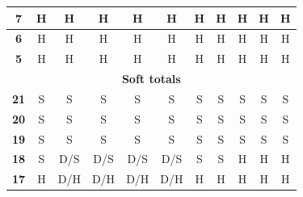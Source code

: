 \documentclass[conference]{IEEEtran}
\begin{document}
\begin{table}[htbp]
\begin{tabular}{|c|c|c|c|c|c|c|c|c|c|c|}
\textbf{7} & \cellcolor[HTML]{FE0000}H & \cellcolor[HTML]{FE0000}H & \cellcolor[HTML]{FE0000}H & \cellcolor[HTML]{FE0000}H & \cellcolor[HTML]{FE0000}H & \cellcolor[HTML]{FE0000}H & \cellcolor[HTML]{FE0000}H & \cellcolor[HTML]{FE0000}H & \cellcolor[HTML]{FE0000}H & \cellcolor[HTML]{FE0000}H \\ \hline
\textbf{6} & \cellcolor[HTML]{FE0000}H & \cellcolor[HTML]{FE0000}H & \cellcolor[HTML]{FE0000}H & \cellcolor[HTML]{FE0000}H & \cellcolor[HTML]{FE0000}H & \cellcolor[HTML]{FE0000}H & \cellcolor[HTML]{FE0000}H & \cellcolor[HTML]{FE0000}H & \cellcolor[HTML]{FE0000}H & \cellcolor[HTML]{FE0000}H \\ \hline
\textbf{5} & \cellcolor[HTML]{FE0000}H & \cellcolor[HTML]{FE0000}H & \cellcolor[HTML]{FE0000}H & \cellcolor[HTML]{FE0000}H & \cellcolor[HTML]{FE0000}H & \cellcolor[HTML]{FE0000}H & \cellcolor[HTML]{FE0000}H & \cellcolor[HTML]{FE0000}H & \cellcolor[HTML]{FE0000}H & \cellcolor[HTML]{FE0000}H \\ \hline
\multicolumn{11}{|c|}{\textbf{Soft totals}} \\ \hline
\textbf{21} & \cellcolor[HTML]{32CB00}S & \cellcolor[HTML]{32CB00}S & \cellcolor[HTML]{32CB00}S & \cellcolor[HTML]{32CB00}S & \cellcolor[HTML]{32CB00}S & \cellcolor[HTML]{32CB00}S & \cellcolor[HTML]{32CB00}S & \cellcolor[HTML]{32CB00}S & \cellcolor[HTML]{32CB00}S & \cellcolor[HTML]{32CB00}S \\ \hline
\textbf{20} & \cellcolor[HTML]{32CB00}S & \cellcolor[HTML]{32CB00}S & \cellcolor[HTML]{32CB00}S & \cellcolor[HTML]{32CB00}S & \cellcolor[HTML]{32CB00}S & \cellcolor[HTML]{32CB00}S & \cellcolor[HTML]{32CB00}S & \cellcolor[HTML]{32CB00}S & \cellcolor[HTML]{32CB00}S & \cellcolor[HTML]{32CB00}S \\ \hline
\textbf{19} & \cellcolor[HTML]{32CB00}S & \cellcolor[HTML]{32CB00}S & \cellcolor[HTML]{32CB00}S & \cellcolor[HTML]{32CB00}S & \cellcolor[HTML]{32CB00}S & \cellcolor[HTML]{32CB00}S & \cellcolor[HTML]{32CB00}S & \cellcolor[HTML]{32CB00}S & \cellcolor[HTML]{32CB00}S & \cellcolor[HTML]{32CB00}S \\ \hline
\textbf{18} & \cellcolor[HTML]{32CB00}S & \cellcolor[HTML]{FFC702}D/S & \cellcolor[HTML]{FFC702}D/S & \cellcolor[HTML]{FFC702}D/S & \cellcolor[HTML]{FFC702}D/S & \cellcolor[HTML]{32CB00}S & \cellcolor[HTML]{32CB00}S & \cellcolor[HTML]{FE0000}H & \cellcolor[HTML]{FE0000}H & \cellcolor[HTML]{FE0000}H \\ \hline
\textbf{17} & \cellcolor[HTML]{FE0000}H & \cellcolor[HTML]{FFC702}D/H & \cellcolor[HTML]{FFC702}D/H & \cellcolor[HTML]{FFC702}D/H & \cellcolor[HTML]{FFC702}D/H & \cellcolor[HTML]{FE0000}H & \cellcolor[HTML]{FE0000}H & \cellcolor[HTML]{FE0000}H & \cellcolor[HTML]{FE0000}H & \cellcolor[HTML]{FE0000}H \\ \hline

\end{tabular}
\end{table}
\end{document}
